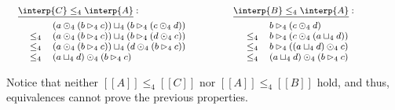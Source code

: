 \begin{example}
\begin{center}
  \begin{math}
    \footnotesize
    \begin{array}{lll}
      \begin{array}{lll}
        \underline{\interp{C} \leq_4 \interp{A}}:\\[4px]
        \,\,\,\,\begin{array}{rl}
               & (a \odot_4 (b \rhd_4 c)) \sqcup_4 (b \rhd_4 (c \odot_4 d))\\
        \leq_4 &  (a \odot_4 (b \rhd_4 c)) \sqcup_4 (b \rhd_4 (d \odot_4 c))\\
        \leq_4 &  (a \odot_4 (b \rhd_4 c)) \sqcup_4 (d \odot_4 (b \rhd_4 c))\\
        \leq_4 &  (a \sqcup_4 d) \odot_4 (b \rhd_4 c)\\
        \end{array}
      \end{array}
      & \quad &
      \begin{array}{lll}
        \underline{\interp{B} \leq_4 \interp{A}}:\\[4px]
        \,\,\,\,\,\begin{array}{lll}
               & b \rhd_4 (c \odot_4 d)\\
        \leq_4 &  b \rhd_4 (c \odot_4 (a \sqcup_4 d))\\
        \leq_4 &  b \rhd_4 ((a \sqcup_4 d) \odot_4 c)\\
        \leq_4 & (a \sqcup_4 d) \odot_4 (b \rhd_4 c)\\
        \end{array}
      \end{array}
    \end{array}
  \end{math}
\end{center}
Notice that neither $[[A]] \leq_4 [[C]]$ nor $[[A]] \leq_4 [[B]]$
hold, and thus, equivalences cannot prove the previous properties.
\end{example}



